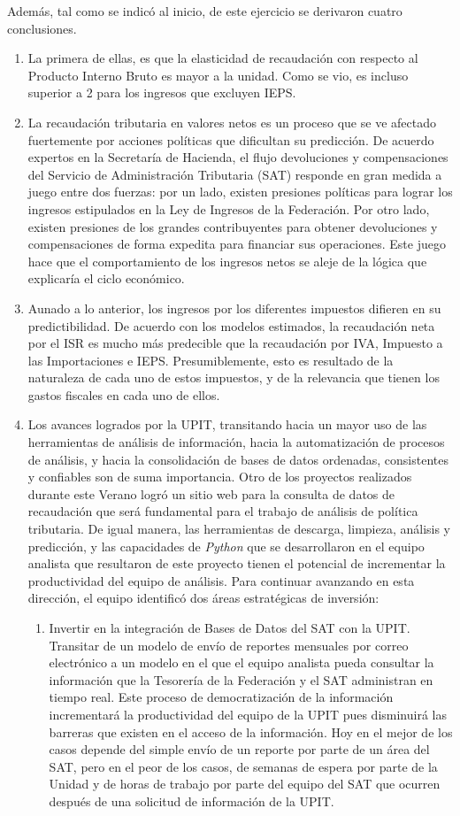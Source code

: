 \documentclass[a4paper, 11pt]{article}
\begin{document}
Además, tal como se indicó al inicio, de este ejercicio se derivaron cuatro conclusiones. 
\begin{enumerate}
	\item La primera de ellas, es que la elasticidad de recaudación con respecto al Producto Interno Bruto es mayor a la unidad. Como se vio, es incluso superior a 2 para los ingresos que excluyen IEPS.
	\item La recaudación tributaria en valores netos es un proceso que se ve afectado fuertemente por acciones políticas que dificultan su predicción. De acuerdo expertos en la Secretaría de Hacienda, el flujo devoluciones y compensaciones del Servicio de Administración Tributaria (SAT) responde en gran medida a juego entre dos fuerzas: por un lado, existen presiones políticas para lograr los ingresos estipulados en la Ley de Ingresos de la Federación. Por otro lado, existen presiones de los grandes contribuyentes para obtener devoluciones y compensaciones de forma expedita para financiar sus operaciones. Este juego hace que el comportamiento de los ingresos netos se aleje de la lógica que explicaría el ciclo económico.
	\item Aunado a lo anterior, los ingresos por los diferentes impuestos difieren en su predictibilidad. De acuerdo con los modelos estimados, la recaudación neta por el ISR es mucho más predecible que la recaudación por IVA, Impuesto a las Importaciones e IEPS. Presumiblemente, esto es resultado de la naturaleza de cada uno de estos impuestos, y de la relevancia que tienen los gastos fiscales en cada uno de ellos.
	\item Los avances logrados por la UPIT, transitando hacia un mayor uso de las herramientas de análisis de información, hacia la automatización de procesos de análisis, y hacia la consolidación de bases de datos ordenadas, consistentes y confiables son de suma importancia. Otro de los proyectos realizados durante este Verano logró un sitio web para la consulta de datos de recaudación que será fundamental para el trabajo de análisis de política tributaria. De igual manera, las herramientas de descarga, limpieza, análisis y predicción, y las capacidades de \textit{Python} que se desarrollaron en el equipo analista que resultaron de este proyecto tienen el potencial de incrementar la productividad del equipo de análisis. Para continuar avanzando en esta dirección, el equipo identificó dos áreas estratégicas de inversión:
	\begin{enumerate}
		\item Invertir en la integración de Bases de Datos del SAT con la UPIT. Transitar de un modelo de envío de reportes mensuales por correo electrónico a un modelo en el que el equipo analista pueda consultar la información que la Tesorería de la Federación y el SAT administran en tiempo real. Este proceso de democratización de la información incrementará la productividad del equipo de la UPIT pues disminuirá las barreras que existen en el acceso de la información. Hoy en el mejor de los casos depende del simple envío de un reporte por parte de un área del SAT, pero en el peor de los casos, de semanas de espera por parte de la Unidad y de horas de trabajo por parte del equipo del SAT que ocurren después de una solicitud de información de la UPIT.

\end{enumerate}
\end{enumerate}
\end{document}
